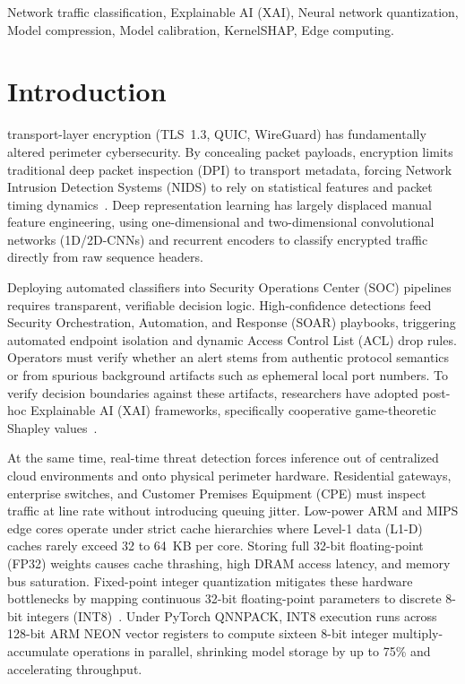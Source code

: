 \documentclass[conference]{IEEEtran}
\begin{document}
\begin{IEEEkeywords}
Network traffic classification, Explainable AI (XAI), Neural network quantization, Model compression, Model calibration, KernelSHAP, Edge computing.
\end{IEEEkeywords}

\section{Introduction}
 transport-layer encryption (TLS~1.3, QUIC, WireGuard) has fundamentally altered perimeter cybersecurity. By concealing packet payloads, encryption limits traditional deep packet inspection (DPI) to transport metadata, forcing Network Intrusion Detection Systems (NIDS) to rely on statistical features and packet timing dynamics~\cite{b1,b2,b3}. Deep representation learning has largely displaced manual feature engineering, using one-dimensional and two-dimensional convolutional networks (1D/2D-CNNs) and recurrent encoders to classify encrypted traffic directly from raw sequence headers.

Deploying automated classifiers into Security Operations Center (SOC) pipelines requires transparent, verifiable decision logic. High-confidence detections feed Security Orchestration, Automation, and Response (SOAR) playbooks, triggering automated endpoint isolation and dynamic Access Control List (ACL) drop rules. Operators must verify whether an alert stems from authentic protocol semantics or from spurious background artifacts such as ephemeral local port numbers. To verify decision boundaries against these artifacts, researchers have adopted post-hoc Explainable AI (XAI) frameworks, specifically cooperative game-theoretic Shapley values~\cite{b4}.

At the same time, real-time threat detection forces inference out of centralized cloud environments and onto physical perimeter hardware. Residential gateways, enterprise switches, and Customer Premises Equipment (CPE) must inspect traffic at line rate without introducing queuing jitter. Low-power ARM and MIPS edge cores operate under strict cache hierarchies where Level-1 data (L1-D) caches rarely exceed 32 to 64~KB per core. Storing full 32-bit floating-point (FP32) weights causes cache thrashing, high DRAM access latency, and memory bus saturation. Fixed-point integer quantization mitigates these hardware bottlenecks by mapping continuous 32-bit floating-point parameters to discrete 8-bit integers (INT8)~\cite{b5}. Under PyTorch QNNPACK, INT8 execution runs across 128-bit ARM NEON vector registers to compute sixteen 8-bit integer multiply-accumulate operations in parallel, shrinking model storage by up to 75\% and accelerating throughput.
\end{document}
